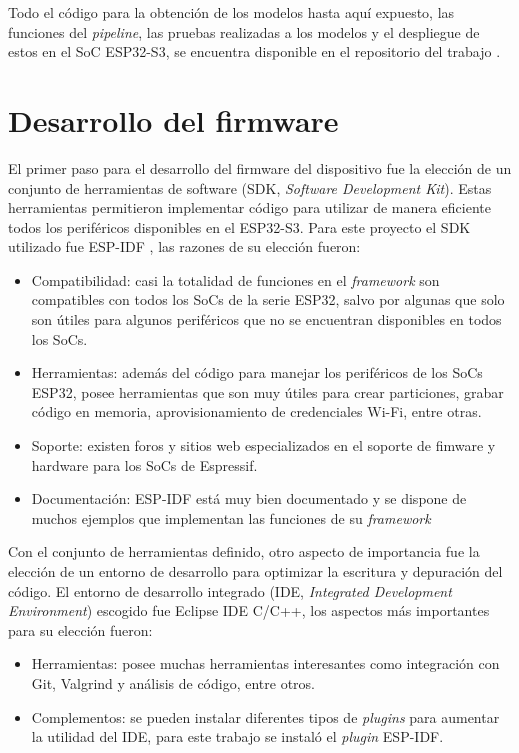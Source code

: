 Todo el código para la obtención de los modelos hasta aquí expuesto, las funciones del \textit{pipeline}, las pruebas realizadas a los modelos y el despliegue de estos en el SoC ESP32-S3, se encuentra disponible en el repositorio del trabajo \cite{mtcnn_repo}.

\section{Desarrollo del firmware}
El primer paso para el desarrollo del firmware del dispositivo fue la elección de un conjunto de herramientas de software (SDK, \textit{Software Development Kit}). Estas herramientas permitieron implementar código para utilizar de manera eficiente todos los periféricos disponibles en el ESP32-S3. Para este proyecto el SDK utilizado fue ESP-IDF \cite{idf_repo}, las razones de su elección fueron:
\begin{itemize}
	\item Compatibilidad: casi la totalidad de funciones en el \textit{framework} son compatibles con todos los SoCs de la serie ESP32, salvo por algunas que solo son útiles para algunos periféricos que no se encuentran disponibles en todos los SoCs.
	\item Herramientas: además del código para manejar los periféricos de los SoCs ESP32, posee herramientas que son muy útiles para crear particiones, grabar código en memoria, aprovisionamiento de credenciales Wi-Fi, entre otras.
	\item Soporte: existen foros y sitios web especializados en el soporte de fimware y hardware para los SoCs de Espressif.
	\item Documentación: ESP-IDF está muy bien documentado y se dispone de muchos ejemplos que implementan las funciones de su \textit{framework}
\end{itemize}

Con el conjunto de herramientas definido, otro aspecto de importancia fue la elección de un entorno de desarrollo para optimizar la escritura y depuración del código. El entorno de desarrollo integrado (IDE, \textit{Integrated Development Environment}) escogido fue Eclipse IDE C/C++, los aspectos más importantes para su elección fueron:
\begin{itemize}
	\item Herramientas: posee muchas herramientas interesantes como integración con Git, Valgrind y análisis de código, entre otros.
	\item Complementos: se pueden instalar diferentes tipos de \textit{plugins} para aumentar la utilidad del IDE, para este trabajo se instaló el \textit{plugin} ESP-IDF.
\end{itemize}

